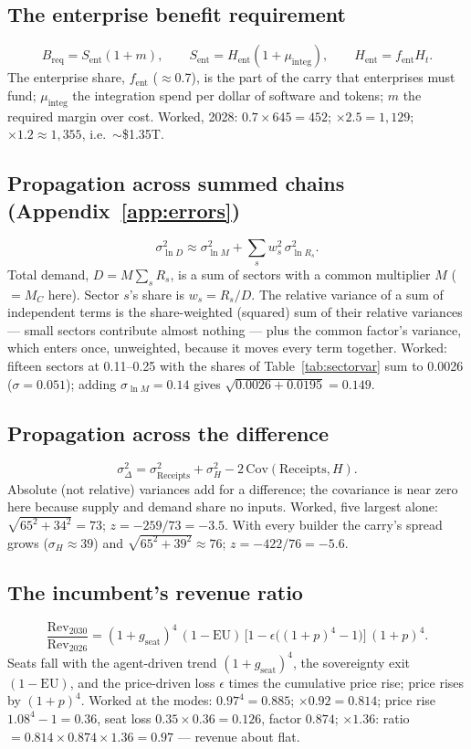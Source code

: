 \documentclass[11pt,letterpaper]{article}
\begin{document}
\subsection*{The enterprise benefit requirement}
\[B_{\text{req}}=S_{\text{ent}}(1+m),\qquad S_{\text{ent}}=H_{\text{ent}}(1+\mu_{\text{integ}}),\qquad H_{\text{ent}}=f_{\text{ent}}H_t.\]
The enterprise share, $f_{\text{ent}}$ ($\approx$0.7), is the part of the carry that enterprises must fund; $\mu_{\text{integ}}$ the integration spend per dollar of software and tokens; $m$ the required margin over cost. Worked, 2028: $0.7\times645=452$; $\times2.5=1{,}129$; $\times1.2\approx1{,}355$, i.e.\ $\sim$\$1.35T.

\subsection*{Propagation across summed chains (Appendix~\ref{app:errors})}
\[\sigma^{2}_{\ln D}\approx\sigma^{2}_{\ln M}+\sum_s w_s^{2}\,\sigma^{2}_{\ln R_s}.\]
Total demand, $D=M\sum_sR_s$, is a sum of sectors with a common multiplier $M$ ($=M_C$ here). Sector $s$'s share is $w_s=R_s/D$. The relative variance of a sum of independent terms is the share-weighted (squared) sum of their relative variances --- small sectors contribute almost nothing --- plus the common factor's variance, which enters once, unweighted, because it moves every term together. Worked: fifteen sectors at 0.11--0.25 with the shares of Table~\ref{tab:sectorvar} sum to 0.0026 ($\sigma=0.051$); adding $\sigma_{\ln M}=0.14$ gives $\sqrt{0.0026+0.0195}=0.149$.

\subsection*{Propagation across the difference}
\[\sigma^{2}_{\Delta}=\sigma^{2}_{\text{Receipts}}+\sigma^{2}_{H}-2\,\text{Cov}(\text{Receipts},H).\]
Absolute (not relative) variances add for a difference; the covariance is near zero here because supply and demand share no inputs. Worked, five largest alone: $\sqrt{65^2+34^2}=73$; $z=-259/73=-3.5$. With every builder the carry's spread grows ($\sigma_H\approx39$) and $\sqrt{65^2+39^2}\approx76$; $z=-422/76=-5.6$.

\subsection*{The incumbent's revenue ratio}
\[\frac{\text{Rev}_{2030}}{\text{Rev}_{2026}}=(1+g_{\text{seat}})^{4}\,(1-\text{EU})\,\bigl[1-\epsilon\bigl((1+p)^{4}-1\bigr)\bigr]\,(1+p)^{4}.\]
Seats fall with the agent-driven trend $(1+g_{\text{seat}})^4$, the sovereignty exit $(1-\text{EU})$, and the price-driven loss $\epsilon$ times the cumulative price rise; price rises by $(1+p)^4$. Worked at the modes: $0.97^4=0.885$; $\times0.92=0.814$; price rise $1.08^4-1=0.36$, seat loss $0.35\times0.36=0.126$, factor $0.874$; $\times1.36$: ratio $=0.814\times0.874\times1.36=0.97$ --- revenue about flat.
\end{document}
